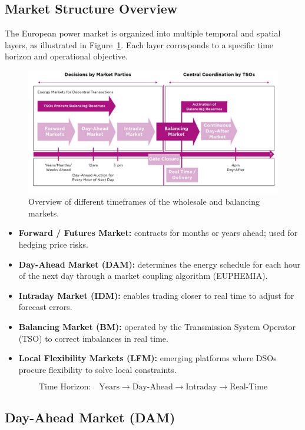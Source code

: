 \documentclass[11pt]{article}
\begin{document}
	\subsection{Market Structure Overview}
	
	The European power market is organized into multiple temporal and spatial layers, as illustrated in Figure~\ref{fig:market_layers}.  
	Each layer corresponds to a specific time horizon and operational objective.
	
	\begin{figure}[ht]
		\centering
		\includegraphics[width=0.7\linewidth]{images/european_electricity_market_layers}
		\caption{Overview of different timeframes of the wholesale and balancing markets.}
		\label{fig:market_layers}
	\end{figure}
	
	
	\begin{itemize}
		\item \textbf{Forward / Futures Market:} contracts for months or years ahead; used for hedging price risks.
		\item \textbf{Day-Ahead Market (DAM):} determines the energy schedule for each hour of the next day through a market coupling algorithm (EUPHEMIA).
		\item \textbf{Intraday Market (IDM):} enables trading closer to real time to adjust for forecast errors.
		\item \textbf{Balancing Market (BM):} operated by the Transmission System Operator (TSO) to correct imbalances in real time.
		\item \textbf{Local Flexibility Markets (LFM):} emerging platforms where DSOs procure flexibility to solve local constraints.
	\end{itemize}
	
	\begin{equation}
		\text{Time Horizon:} \quad \text{Years} \rightarrow \text{Day-Ahead} \rightarrow \text{Intraday} \rightarrow \text{Real-Time}
	\end{equation}
	
	\subsection{Day-Ahead Market (DAM)}
	
\end{document}
